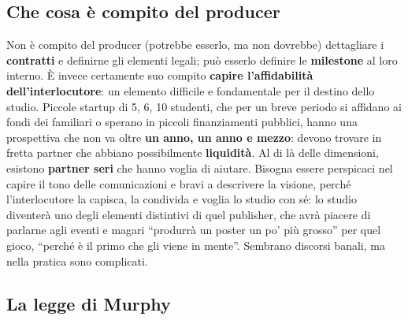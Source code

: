 \subsection{Che cosa è compito del producer}

Non è compito del producer (potrebbe esserlo, ma non dovrebbe) dettagliare i
\textbf{contratti} e definirne gli elementi legali; può esserlo definire le
\textbf{milestone} al loro interno. È invece certamente suo compito
\textbf{capire l'affidabilità dell'interlocutore}: un elemento difficile e
fondamentale per il destino dello studio. Piccole startup di 5, 6, 10 studenti,
che per un breve periodo si affidano ai fondi dei familiari o sperano in piccoli
finanziamenti pubblici, hanno una prospettiva che non va oltre \textbf{un anno,
un anno e mezzo}: devono trovare in fretta partner che abbiano possibilmente
\textbf{liquidità}. Al di là delle dimensioni, esistono \textbf{partner seri} che
hanno voglia di aiutare. Bisogna essere perspicaci nel capire il tono delle
comunicazioni e bravi a descrivere la visione, perché l'interlocutore la capisca,
la condivida e voglia lo studio con sé: lo studio diventerà uno degli elementi
distintivi di quel publisher, che avrà piacere di parlarne agli eventi e magari
``produrrà un poster un po' più grosso'' per quel gioco, ``perché è il primo che
gli viene in mente''. Sembrano discorsi banali, ma nella pratica sono complicati.

\subsection{La legge di Murphy}

